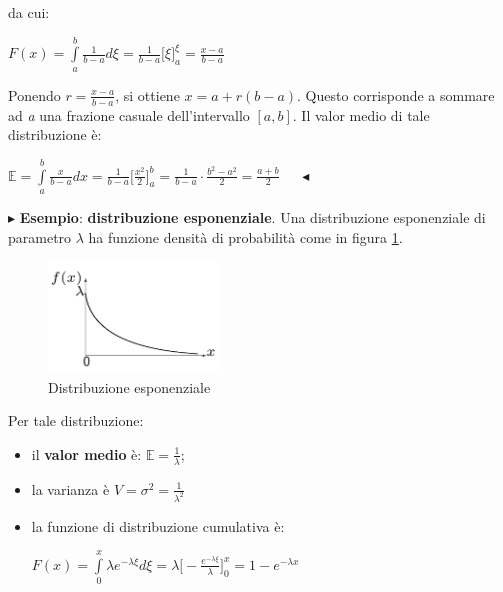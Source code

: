 \documentclass[11pt]{book}
\begin{document}
da cui:

\begin{center}
$F(x) = \int\limits_{a}^b \frac{1}{b-a}d\xi = \frac{1}{b-a}\bigr[\xi \bigr]_a^\xi
  = \frac{x-a}{b-a}$  
\end{center}

Ponendo $r = \frac{x-a}{b-a}$, si ottiene $x = a+r(b-a)$. Questo
corrisponde a sommare ad {\em a} una frazione casuale dell'intervallo
$[a,b]$. Il valor medio di tale distribuzione \`e:

\begin{center}
$\mathbb{E} = \int\limits_{a}^b \frac{x}{b-a}dx = \frac{1}{b-a}
  \biggr[ \frac{x^2}{2} \biggr]_a^b = \frac{1}{b-a} \cdot
  \frac{b^2-a^2}{2} = \frac{a+b}{2}$ $\quad\blacktriangleleft$
\end{center}
\vspace{11pt}

\vspace{11pt}
$\blacktriangleright$ {\bf Esempio}: {\bf distribuzione
  esponenziale}. Una distribuzione esponenziale di parametro $\lambda$
ha funzione densit\`a di probabilit\`a come in figura \ref{cap11fig3}.

\begin{figure}[H]
  \centering
  \includegraphics[width=0.4\textwidth]{images/cap11fig3.png}
  \caption{Distribuzione esponenziale}
  \label{cap11fig3}
\end{figure}

Per tale distribuzione:

\begin{itemize}
\item il {\bf valor medio} \`e: $\mathbb{E} = \frac{1}{\lambda}$;
\item la varianza \`e $V = \sigma^2 = \frac{1}{\lambda^2}$
\item la funzione di distribuzione cumulativa \`e:
\begin{center}
 $F(x) = \int\limits_{0}^x \lambda e^{-\lambda \xi} d\xi = \lambda
  \biggr[ - \frac{e^{-\lambda \xi}}{\lambda} \biggr]_0^{x} =
  1-e^{-\lambda x}$
\end{center}
\end{itemize}
\end{document}
